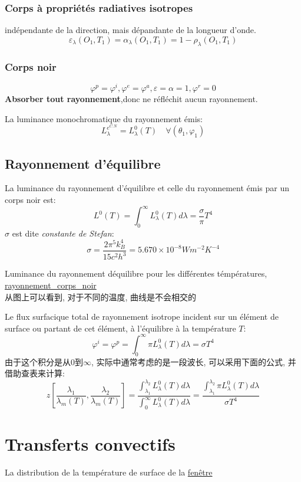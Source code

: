 \documentclass{article}
\begin{document}
\subsubsection{Corps \`a propri\'et\'es radiatives isotropes}
ind\'ependante de la direction, mais d\'epandante de la longueur d'onde.
$$\varepsilon_{\lambda}(O_1, T_1) = \alpha_{\lambda}(O_1, T_1) = 1 - \rho_{\lambda}(O_1, T_1)$$

\subsubsection{Corps noir}
$$\varphi^p = \varphi^i,\varphi^e = \varphi^a,\varepsilon=\alpha=1,\varphi^r=0$$
\textbf{Absorber tout rayonnement},donc ne r\'efl\'echit aucun rayonnement.

La luminance monochromatique du rayonnement \'emis:
$$L_{\lambda}^{e^{C.N}}= L_{\lambda}^0(T) \quad \forall(\theta_1,\varphi_1)$$

\subsection{Rayonnement d'\'equilibre}
La luminance du rayonnement d'\'equilibre et celle du rayonnement \'emis par un corps noir est:
$$L^0(T)=\int_{0}^{\infty}L_{\lambda}^0(T)d \lambda =\frac{\sigma}{\pi}T^4$$
$\sigma$ est dite \textit{constante de Stefan}:
$$\sigma=\frac{ 2\pi^5 k_B^4}{15c^2 h^3}=5.670\times 10^{-8} Wm^{-2}K^{-4}$$

Luminance du rayonnement d\'equilibre pour les diff\'erentes t\'emp\'eratures, \href{http://www.afhalifax.ca/magazine/wp-content/sciences/Planck/Le\%20corps\%20noir\_files/rayonnement\_corps\_noir.png}{rayonnement\_corps\_noir}\\
从图上可以看到, 对于不同的温度, 曲线是不会相交的

Le flux surfacique total de rayonnement isotrope incident sur un \'el\'ement de surface ou partant de cet \'el\'ement, \`a l'\'equilibre \`a la temp\'erature $T$:
$$\varphi^i=\varphi^p=\int_{0}^{\infty}\pi L_{\lambda}^0(T)d \lambda =\sigma T^4$$
由于这个积分是从$0$到$\infty$, 实际中通常考虑的是一段波长, 可以采用下面的公式, 并借助查表来计算:
$$
z[\frac{ \lambda _1}{\lambda _m(T)}, \frac{ \lambda _2}{\lambda _m(T)}]
= \frac{ \int_{\lambda _1}^{\lambda _2} L_{\lambda}^0(T)d \lambda }{\int_{0}^{\infty}L_{\lambda}^0(T)d \lambda }
= \frac{ \int_{\lambda _1}^{\lambda _2}\pi L_{\lambda}^0(T)d \lambda }{\sigma T^4}
$$

\section{Transferts convectifs}
La distribution de la température de surface de la \href{http://i.imgbox.com/o4djIdyE.png}{fenêtre}
\end{document}
